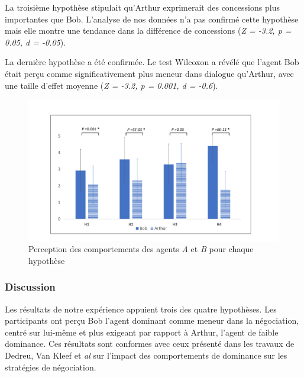 {			La troisième hypothèse stipulait qu'Arthur exprimerait des concessions plus importantes que Bob. L'analyse de nos données n'a pas confirmé cette hypothèse mais elle montre une tendance dans la différence de concessions (\emph {Z = -3.2, p = 0.05, d = -0.05}).
			
			La dernière hypothèse a été confirmée. Le test Wilcoxon a révélé que l'agent Bob était perçu comme significativement plus meneur dans dialogue qu'Arthur, avec une taille d'effet moyenne (\emph {Z = -3.2, p = 0.001, d = -0.6}).
			
			
			\begin{figure}[t]
				\centering
				\includegraphics[width=\textwidth]{Figures/chap4/AH/res.pdf}
				\caption{Perception des comportements des agents \textit{A} et \textit{B} pour chaque hypothèse}
				\label{res}
				\end{figure}
				
				\subsubsection{Discussion}
				
				Les résultats de notre expérience appuient trois des quatre hypothèses. Les participants ont perçu Bob l'agent dominant comme meneur dans la négociation, centré sur lui-même et plus exigeant par rapport à Arthur, l'agent de faible dominance. Ces résultats sont conformes avec ceux présenté dans les travaux de Dedreu, Van Kleef et \emph{al} \cite {de1995impact, de2004influence, de2004influence} sur l'impact des comportements de dominance sur les stratégies de négociation.
				
}
